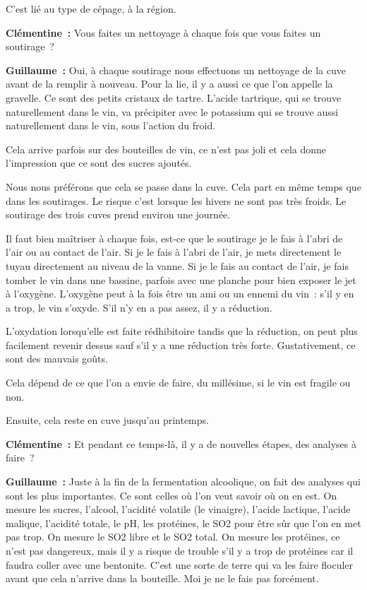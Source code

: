 \documentclass[a4paper, titlepage]{report}
\begin{document}
C'est lié au type de cépage, à la région.

\textbf{Clémentine~:} Vous faites un nettoyage à chaque fois que vous
faites un soutirage~?

\textbf{Guillaume~:} Oui, à chaque soutirage nous effectuons un
nettoyage de la cuve avant de la remplir à nouveau. Pour la lie, il y a
aussi ce que l'on appelle la gravelle. Ce sont des petits cristaux de
tartre. L'acide tartrique, qui se trouve naturellement dans le vin, va
précipiter avec le potassium qui se trouve aussi naturellement dans le
vin, sous l'action du froid.

Cela arrive parfois sur des bouteilles de vin, ce n'est pas joli et cela
donne l'impression que ce sont des sucres ajoutés.

Nous nous préférons que cela se passe dans la cuve. Cela part en même
temps que dans les soutirages. Le risque c'est lorsque les hivers ne
sont pas très froids. Le soutirage des trois cuves prend environ une
journée.

Il faut bien maîtriser à chaque fois, est-ce que le soutirage je le fais
à l'abri de l'air ou au contact de l'air. Si je le fais à l'abri de
l'air, je mets directement le tuyau directement au niveau de la vanne.
Si je le fais au contact de l'air, je fais tomber le vin dans une
bassine, parfois avec une planche pour bien exposer le jet à l'oxygène.
L'oxygène peut à la fois être un ami ou un ennemi du vin~: s'il y en a
trop, le vin s'oxyde. S'il n'y en a pas assez, il y a réduction.

L'oxydation lorsqu'elle est faite rédhibitoire tandis que la réduction,
on peut plus facilement revenir dessus sauf s'il y a une réduction très
forte. Gustativement, ce sont des mauvais goûts.

Cela dépend de ce que l'on a envie de faire, du millésime, si le vin est
fragile ou non.

Ensuite, cela reste en cuve jusqu'au printemps.

\textbf{Clémentine~:} Et pendant ce temps-là, il y a de nouvelles
étapes, des analyses à faire~?

\textbf{Guillaume~:} Juste à la fin de la fermentation alcoolique, on
fait des analyses qui sont les plus importantes. Ce sont celles où l'on
veut savoir où on en est. On mesure les sucres, l'alcool, l'acidité
volatile (le vinaigre), l'acide lactique, l'acide malique, l'acidité
totale, le pH, les protéines, le SO2 pour être sûr que l'on en met pas
trop. On mesure le SO2 libre et le SO2 total. On mesure les protéines,
ce n'est pas dangereux, mais il y a risque de trouble s'il y a trop de
protéines car il faudra coller avec une bentonite. C'est une sorte de
terre qui va les faire floculer avant que cela n'arrive dans la
bouteille. Moi je ne le fais pas forcément.
\end{document}

